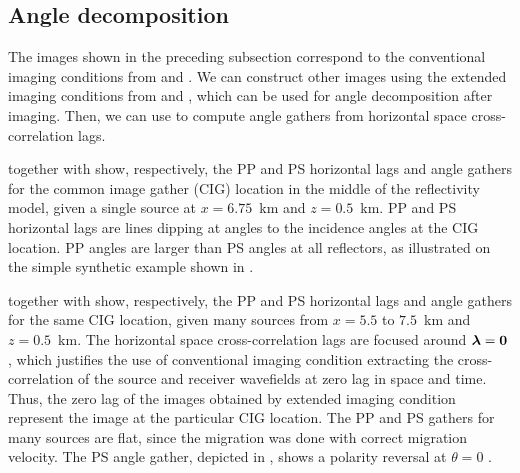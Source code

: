 \subsection{Angle decomposition}

The images shown in the preceding subsection correspond to the
conventional imaging conditions from  and .  We can
construct other images using the extended imaging conditions from
 and , which can be used for angle decomposition
after imaging. Then, we can use  to compute angle
gathers from horizontal space cross-correlation lags.

 \geosout{\&} 
 together with
 \geosout{\&} 
 show, respectively, the PP and PS
horizontal lags and angle gathers for the common image gather (CIG)
location in the middle of the reflectivity model, given a single
source at $x=6.75$~km and $z=0.5$~km. PP and PS horizontal lags are
lines dipping at angles   to the
incidence angles  at
the CIG location. PP angles are larger than PS angles at all
reflectors, as illustrated on the simple synthetic example shown in
.

 \geosout{\&}  
together with  \geosout{\&} 
 show, respectively, the PP and PS
horizontal lags and angle gathers for the same CIG location, given
many sources from $x=5.5$ to $7.5$~km and $z=0.5$~km. The horizontal
space cross-correlation lags are focused around ${\boldsymbol{\lambda}}=\mathbf{0}$,
which justifies the use of conventional imaging condition extracting
the cross-correlation of the source and receiver wavefields at zero
lag in space and time. Thus, the zero lag of the images obtained by
extended imaging condition represent the image at the particular CIG
location. The PP and PS gathers for many sources are flat, since the
migration was done with correct migration velocity. The PS angle
gather, depicted in , shows a polarity
reversal at $\theta=0$ .

